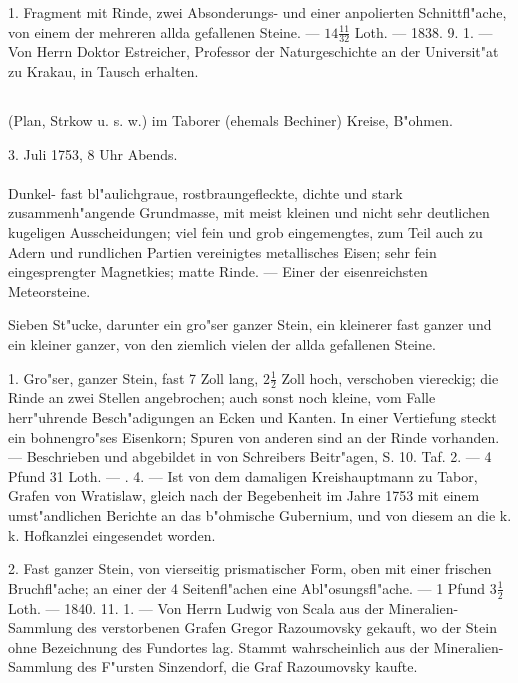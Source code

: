 \documentclass[a4paper, 11pt, oneside, polutonikogreek, german]{article}
\begin{document}
1. Fragment mit Rinde, zwei Absonderungs- und einer anpolierten Schnittfl"ache, von einem der mehreren allda gefallenen Steine. --- $14\frac{11}{32}$ Loth. --- 1838. 9. 1. --- Von Herrn Doktor Estreicher, Professor der Naturgeschichte an der Universit"at zu Krakau, in Tausch erhalten.
\subsection{}
\begin{center}

(Plan, Strkow u. s. w.) im Taborer (ehemals Bechiner) Kreise, B"ohmen.

3. Juli 1753, 8 Uhr Abends.
\end{center}
\paragraph{}
Dunkel- fast bl"aulichgraue, rostbraungefleckte, dichte und stark zusammenh"angende Grundmasse, mit meist kleinen und nicht sehr deutlichen kugeligen Ausscheidungen; viel fein und grob eingemengtes, zum Teil auch zu Adern und rundlichen Partien vereinigtes metallisches Eisen; sehr fein eingesprengter Magnetkies; matte Rinde. --- Einer der eisenreichsten Meteorsteine.

Sieben St"ucke, darunter ein gro"ser ganzer Stein, ein kleinerer fast ganzer und ein kleiner ganzer, von den ziemlich vielen der allda gefallenen Steine.

1. Gro"ser, ganzer Stein, fast 7 Zoll lang, $2\frac{1}{2}$ Zoll hoch, verschoben viereckig; die Rinde an zwei Stellen angebrochen; auch sonst noch kleine, vom Falle herr"uhrende Besch"adigungen an Ecken und Kanten. In einer Vertiefung steckt ein bohnengro"ses Eisenkorn; Spuren von anderen sind an der Rinde vorhanden. --- Beschrieben und abgebildet in von Schreibers Beitr"agen, S. 10. Taf. 2. --- 4 Pfund 31 Loth. --- . 4. --- Ist von dem damaligen Kreishauptmann zu Tabor, Grafen von Wratislaw, gleich nach der Begebenheit im Jahre 1753 mit einem umst"andlichen Berichte an das b"ohmische Gubernium, und von diesem an die k. k. Hofkanzlei eingesendet worden.

2. Fast ganzer Stein, von vierseitig prismatischer Form, oben mit einer frischen Bruchfl"ache; an einer der 4 Seitenfl"achen eine Abl"osungsfl"ache. --- 1 Pfund $3\frac{1}{2}$ Loth. --- 1840. 11. 1. --- Von Herrn Ludwig von Scala aus der Mineralien-Sammlung des verstorbenen Grafen Gregor Razoumovsky gekauft, wo der Stein ohne Bezeichnung des Fundortes lag. Stammt wahrscheinlich aus der Mineralien-Sammlung des F"ursten Sinzendorf, die Graf Razoumovsky kaufte.
\end{document}
